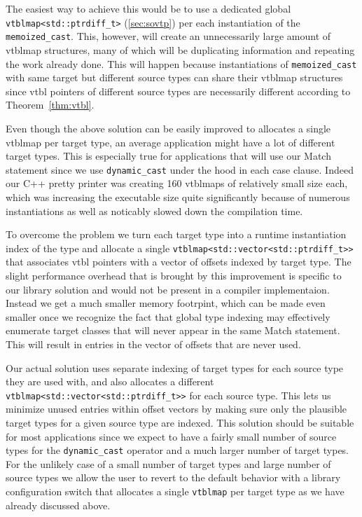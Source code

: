 \documentclass[preprint]{sigplanconf}
\makeatletter
\DeclareRobustCommand{\code}[1]{{\lstinline[breaklines=false,escapechar=@]{#1}}}
\makeatother
\begin{document}
The easiest way to achieve this would be to use a dedicated global
\code{vtblmap<std::ptrdiff_t>} (\textsection\ref{sec:sovtp}) per each 
instantiation of the \code{memoized_cast}. This, however, will create an 
unnecessarily large amount of vtblmap structures, many of which will be  
duplicating information and repeating the work already done. This will happen 
because instantiations of \code{memoized_cast} with same target but different 
source types can share their vtblmap structures since vtbl pointers of different 
source types are necessarily different according to Theorem~\ref{thm:vtbl}. 

Even though the above solution can be easily improved to allocates a single 
vtblmap per target type, an average application might have a lot of different 
target types. This is especially true for applications that will use our Match 
statement since we use \code{dynamic_cast} under the hood in each case clause. 
Indeed our C++ pretty printer was creating 160 vtblmaps of relatively small size 
each, which was increasing the executable size quite significantly because of 
numerous instantiations as well as noticably slowed down the compilation time.

To overcome the problem we turn each target type into a runtime instantiation 
index of the type and allocate a single \code{vtblmap<std::vector<std::ptrdiff_t>>} 
that associates vtbl pointers with a vector of offsets indexed by target type. 
The slight performance overhead that is brought by this improvement is specific 
to our library solution and would not be present in a compiler implementaion. 
Instead we get a much smaller memory footrpint, which can be made even smaller 
once we recognize the fact that global type indexing may effectively enumerate 
target classes that will never appear in the same Match statement. This will 
result in entries in the vector of offsets that are never used.

Our actual solution uses separate indexing of target types for each source type 
they are used with, and also allocates a different 
\code{vtblmap<std::vector<std::ptrdiff_t>>} for each source type. This lets us 
minimize unused entries within offset vectors by making sure only the plausible 
target types for a given source type are indexed. This solution should be 
suitable for most applications since we expect to have a fairly small 
number of source types for the \code{dynamic_cast} operator and a much larger number 
of target types. For the unlikely case of a small number of target types and large 
number of source types we allow the user to revert to the default behavior with a 
library configuration switch that allocates a single \code{vtblmap} per target type as 
we have already discussed above.
\end{document}
